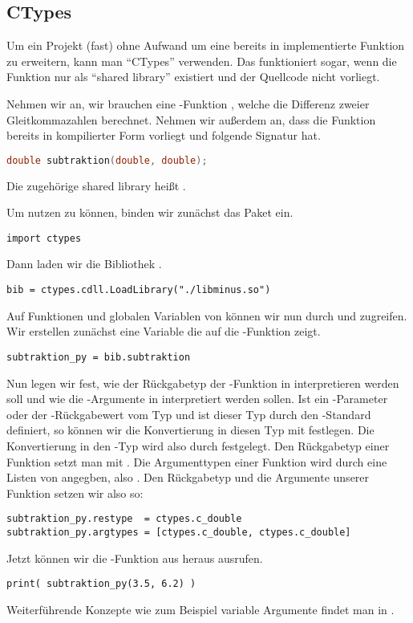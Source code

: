 \subsection{CTypes}
\label{section:python_mit_c:ctypes}
Um ein \Python Projekt (fast) ohne Aufwand um eine bereits in \C implementierte Funktion zu erweitern, kann man ``CTypes'' verwenden.
Das funktioniert sogar, wenn die Funktion nur als ``shared library'' existiert und der Quellcode nicht vorliegt.

Nehmen wir an, wir brauchen eine \Python-Funktion , welche die Differenz zweier Gleitkommazahlen berechnet.
Nehmen wir außerdem an, dass die Funktion bereits in kompilierter Form vorliegt und folgende Signatur hat.
\begin{lstlisting}[language=C++,style=CPP]
double subtraktion(double, double);
\end{lstlisting}
Die zugehörige shared library heißt .

Um  nutzen zu können, binden wir zunächst das Paket  ein.
\begin{lstlisting}
import ctypes
\end{lstlisting}
Dann laden wir die Bibliothek .
\begin{lstlisting}
bib = ctypes.cdll.LoadLibrary("./libminus.so")
\end{lstlisting}
Auf Funktionen  und globalen Variablen  von  können wir nun durch  und  zugreifen.
Wir erstellen zunächst eine Variable  die auf die \C-Funktion  zeigt.
\begin{lstlisting}
subtraktion_py = bib.subtraktion
\end{lstlisting}
Nun legen wir fest, wie der Rückgabetyp der \C-Funktion in \Python interpretieren werden soll und wie die \Python-Argumente in \C interpretiert werden sollen.
Ist ein \C-Parameter oder der \C-Rückgabewert vom Typ  und ist dieser Typ durch den \C-Standard definiert, so können wir die Konvertierung in diesen Typ mit  festlegen.
Die Konvertierung in den \C-Typ  wird also durch  festgelegt.
Den Rückgabetyp einer Funktion  setzt man mit .
Die Argumenttypen einer Funktion  wird durch eine Listen von  angegben, also .
Den Rückgabetyp und die Argumente unserer Funktion  setzen wir also so:
\begin{lstlisting}
subtraktion_py.restype  = ctypes.c_double
subtraktion_py.argtypes = [ctypes.c_double, ctypes.c_double]
\end{lstlisting}
Jetzt können wir die \C-Funktion aus \Python heraus ausrufen.
\begin{lstlisting}
print( subtraktion_py(3.5, 6.2) )
\end{lstlisting}

Weiterführende Konzepte wie zum Beispiel variable Argumente findet man in \cite[Library, Generic Operating System Services, CTypes]{Python3}.